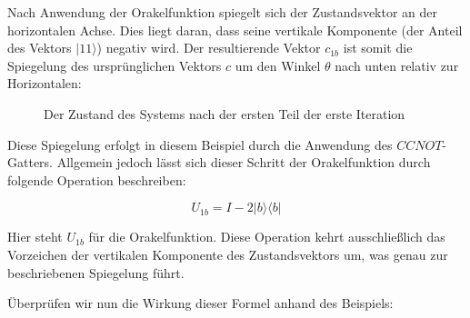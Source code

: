 {Nach Anwendung der Orakelfunktion spiegelt sich der Zustandsvektor an der horizontalen Achse. Dies liegt daran, dass seine vertikale Komponente (der Anteil des Vektors $|11\rangle$) negativ wird. Der resultierende Vektor $c_{1b}$ ist somit die Spiegelung des ursprünglichen Vektors $c$ um den Winkel $\theta$ nach unten relativ zur Horizontalen:

\begin{figure}[H]
    \centering
{}
    \caption{Der Zustand des Systems nach der ersten Teil der erste Iteration}
    \label{fig:after-first-part-grover-three-qubits}
\end{figure}

Diese Spiegelung erfolgt in diesem Beispiel durch die Anwendung des $CCNOT$-Gatters. Allgemein jedoch lässt sich dieser Schritt der Orakelfunktion durch folgende Operation beschreiben:

$$
U_{1b} = I - 2|b\rangle \langle b|
$$

Hier steht $U_{1b}$ für die Orakelfunktion. Diese Operation kehrt ausschließlich das Vorzeichen der vertikalen Komponente des Zustandsvektors um, was genau zur beschriebenen Spiegelung führt.

Überprüfen wir nun die Wirkung dieser Formel anhand des Beispiels:

}
